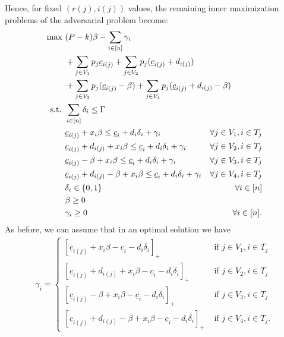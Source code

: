 \documentclass[a4paper,11pt,abstracton]{scrartcl}
\theoremstyle{definition}
\theoremstyle{remark}
\begin{document}
Hence, for fixed $(r(j),i(j))$ values, 
the remaining inner maximization problems of the adversarial problem become:
\begin{align}
\label{eq:complicated-rj-ij}
\max\ & (P-k)\beta - \sum_{i\in[n]} \gamma_i \\
& + \sum_{j\in V_1} p_j \underline{c}_{i(j)}
+ \sum_{j\in V_2} p_j (\underline{c}_{i(j)} + d_{i(j)}) \nonumber \\
& + \sum_{j\in V_3} p_j (\underline{c}_{i(j)} - \beta)
+ \sum_{j\in V_4} p_j (\underline{c}_{i(j)} + d_{i(j)} - \beta) \hspace{-4cm} \nonumber\\
\text{s.t. } & \sum_{i\in[n]} \delta_i \le \Gamma \nonumber\\
& \underline{c}_{i(j)} + x_i \beta \le \underline{c}_i + d_i\delta_i + \gamma_i & \forall j\in V_1, i\in T_j \nonumber\\
& \underline{c}_{i(j)} + d_{i(j)} + x_i \beta \le \underline{c}_i + d_i\delta_i + \gamma_i & \forall j\in V_2, i\in T_j \nonumber\\
& \underline{c}_{i(j)} -\beta + x_i \beta \le \underline{c}_i + d_i\delta_i + \gamma_i & \forall j\in V_3, i\in T_j \nonumber\\
& \underline{c}_{i(j)} + d_{i(j)} - \beta + x_i \beta \le \underline{c}_i + d_i\delta_i + \gamma_i & \forall j\in V_4, i\in T_j \nonumber\\
& \delta_i\in\{0,1\} & \forall i\in[n] \nonumber\\
& \beta \ge 0 \nonumber\\
& \gamma_i \ge 0 & \forall i\in[n]. \nonumber
\end{align}
As before, we can assume that in an optimal solution we have
\begin{align}
\label{eq:gamma-rj-ij}
\gamma_i = \begin{cases}
[\underline{c}_{i(j)} + x_i \beta - \underline{c}_i - d_i\delta_i]_+ & \text{ if } j\in V_1, i \in T_j \\
[\underline{c}_{i(j)} + d_{i(j)} + x_i \beta - \underline{c}_i - d_i\delta_i]_+ & \text{ if } j\in V_2, i \in T_j \\
[\underline{c}_{i(j)} -\beta + x_i \beta - \underline{c}_i - d_i\delta_i]_+ & \text{ if } j\in V_3, i \in T_j \\
[\underline{c}_{i(j)} + d_{i(j)} - \beta + x_i \beta - \underline{c}_i - d_i\delta_i]_+ & \text{ if } j\in V_4, i \in T_j. 
\end{cases}
\end{align}
\end{document}
